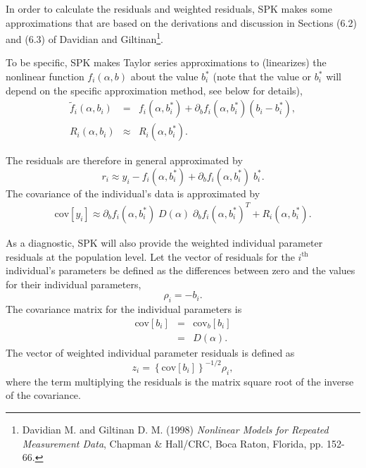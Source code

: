 \documentclass{article}
\begin{document}
In order to calculate the residuals and weighted residuals, SPK makes
some approximations that are based on the derivations and discussion
in Sections (6.2) and (6.3) of Davidian and Giltinan\footnote{
  Davidian M. and Giltinan D. M. (1998) 
  {\em Nonlinear Models for Repeated Measurement Data}, Chapman \&
  Hall/CRC, Boca Raton, Florida, pp. 152-66.
}.

To be specific, SPK makes Taylor series approximations to (linearizes)
the nonlinear function $f_i(\alpha,b)$
about the value $b^{\ast}_i$ (note that the value or $b^{\ast}_i$ will
depend on the specific approximation method, see below for details),
  \begin{eqnarray}
    \tilde{f}_i(\alpha, b_i) & = &  f_i(\alpha, b^{\ast}_i)
      + \partial_b f_i(\alpha, b^{\ast}_i) ( b_i - b^{\ast}_i ) , \\
    R_i(\alpha, b_i) & \approx &  R_i(\alpha, b^{\ast}_i) .
  \end{eqnarray}

The residuals are therefore in general approximated by
  \begin{equation}
    r_i \approx y_i - f_i(\alpha, b^{\ast}_i)
      + \partial_b f_i(\alpha, b^{\ast}_i) \; b^{\ast}_i .
  \end{equation}
The covariance of the individual's data is approximated by
  \begin{eqnarray}
    \mbox{cov}[y_i] \approx \partial_b f_i(\alpha, b^{\ast}_i) \;
        D(\alpha) \; \partial_b f_i(\alpha, b^{\ast}_i)^T
      + R_i(\alpha, b^{\ast}_i) .
  \end{eqnarray}

As a diagnostic, SPK will also provide the weighted individual 
parameter residuals at the population level.
Let the vector of residuals for the $i^{\mbox{th}}$ individual's 
parameters be defined as the differences between zero and the 
values for their individual parameters,
  \begin{equation}
    \rho_i = - b_i .
  \end{equation}
The covariance matrix for the individual parameters is
  \begin{eqnarray}
    \mbox{cov}[b_i] & = & \mbox{cov}_{b}
          \left[ b_i \right] \nonumber \\
        & = & D(\alpha) .
  \end{eqnarray}
The vector of weighted individual parameter residuals is
defined as 
  \begin{equation}
    z_i = \left\{ \mbox{cov}[b_i] \right\}^{-1/2} \rho_i,
  \end{equation}
where the term multiplying the residuals is the matrix square 
root of the inverse of the covariance.
\end{document}
